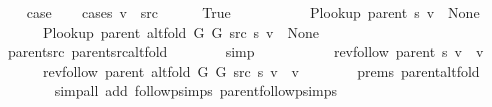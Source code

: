 \begin{isabellebody}
\ \ \isamarkupfalse%
\ {\isacharquery}{\kern0pt}case\isanewline
\ \ \isamarkupfalse%
\ {\isacharparenleft}{\kern0pt}cases\ {\isachardoublequoteopen}v\ {\isacharequal}{\kern0pt}\ src{\isachardoublequoteclose}{\isacharparenright}{\kern0pt}\isanewline
\ \ \ \ \isamarkupfalse%
\ True\isanewline
\ \ \ \ \isamarkupfalse%
\isanewline
\ \ \ \ \ \ {\isachardoublequoteopen}P{\isacharunderscore}{\kern0pt}lookup\ {\isacharparenleft}{\kern0pt}parent\ s{\isacharparenright}{\kern0pt}\ v\ {\isacharequal}{\kern0pt}\ None{\isachardoublequoteclose}\isanewline
\ \ \ \ \ \ {\isachardoublequoteopen}P{\isacharunderscore}{\kern0pt}lookup\ {\isacharparenleft}{\kern0pt}parent\ {\isacharparenleft}{\kern0pt}alt{\isacharunderscore}{\kern0pt}fold\ G{}\ G{}\ src\ s{\isacharparenright}{\kern0pt}{\isacharparenright}{\kern0pt}\ v\ {\isacharequal}{\kern0pt}\ None{\isachardoublequoteclose}\isanewline
\ \ \ \ \ \ \isamarkupfalse%
\ parent{\isacharunderscore}{\kern0pt}src\ parent{\isacharunderscore}{\kern0pt}src{\isacharunderscore}{\kern0pt}alt{\isacharunderscore}{\kern0pt}fold\isanewline
\ \ \ \ \ \ \isamarkupfalse%
\ simp{\isacharplus}{\kern0pt}\isanewline
\ \ \ \ \isamarkupfalse%
\isanewline
\ \ \ \ \ \ {\isachardoublequoteopen}rev{\isacharunderscore}{\kern0pt}follow\ {\isacharparenleft}{\kern0pt}parent\ s{\isacharparenright}{\kern0pt}\ v\ {\isacharequal}{\kern0pt}\ {\isacharbrackleft}{\kern0pt}v{\isacharbrackright}{\kern0pt}{\isachardoublequoteclose}\isanewline
\ \ \ \ \ \ {\isachardoublequoteopen}rev{\isacharunderscore}{\kern0pt}follow\ {\isacharparenleft}{\kern0pt}parent\ {\isacharparenleft}{\kern0pt}alt{\isacharunderscore}{\kern0pt}fold\ G{}\ G{}\ src\ s{\isacharparenright}{\kern0pt}{\isacharparenright}{\kern0pt}\ v\ {\isacharequal}{\kern0pt}\ {\isacharbrackleft}{\kern0pt}v{\isacharbrackright}{\kern0pt}{\isachardoublequoteclose}\isanewline
\ \ \ \ \ \ \isamarkupfalse%
\ {\isachardoublequoteopen}{}{\isachardot}{\kern0pt}prems{\isachardoublequoteclose}{\isacharparenleft}{\kern0pt}{}{\isacharparenright}{\kern0pt}\ parent{\isacharunderscore}{\kern0pt}alt{\isacharunderscore}{\kern0pt}fold\isanewline
\ \ \ \ \ \ \isamarkupfalse%
\ {\isacharparenleft}{\kern0pt}simp{\isacharunderscore}{\kern0pt}all\ add{\isacharcolon}{\kern0pt}\ follow{\isacharunderscore}{\kern0pt}psimps\ parent{\isachardot}{\kern0pt}follow{\isacharunderscore}{\kern0pt}psimps{\isacharparenright}{\kern0pt}\isanewline

\end{isabellebody}
